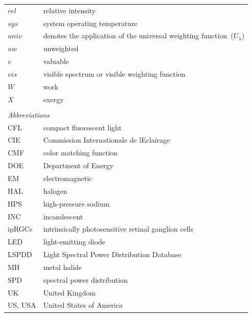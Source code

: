 \documentclass[energies,article,accept,moreauthors,pdftex]{Definitions/mdpi}\usepackage[]{graphicx}\usepackage[]{color}
\begin{document}
\noindent
\begin{tabular}{ll}
  $rel$ & relative intensity \\
  $sys$ & system operating temperature \\
  $univ$ & denotes the application of the universal weighting function~($U_\lambda$) \\
  $uw$ & unweighted \\
  $v$ & valuable \\
  $vis$ & visible spectrum or visible weighting function \\
  $W$ & work \\
  $X$ & exergy \\
%
\\
\multicolumn{2}{l}{\emph{Abbreviations}} \\ 
%
  CFL & compact fluorescent light \\
  CIE & Commission Internationale de l\textquotesingle{}Eclairage \\
  CMF & color matching function \\
  DOE & Department of Energy \\
  EM & electromagnetic \\
  HAL & halogen \\
  HPS & high-pressure sodium \\
  INC & incandescent \\
  ipRGCs & intrinsically photosensitive retinal ganglion cells \\
  LED & light-emitting diode \\
  LSPDD & Light Spectral Power Distribution Database \\
  MH & metal halide \\
  SPD & spectral power distribution \\
  UK & United Kingdom \\
  US, USA & United States of America \\
\end{tabular}
\end{document}
